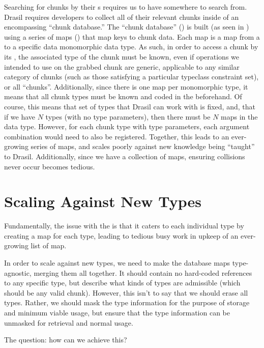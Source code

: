 
Searching for chunks by their \UID{}s requires us to have somewhere to search
from. Drasil requires developers to collect all of their relevant chunks inside
of an encompassing ``chunk database.'' The ``chunk database'' (\ChunkDB{}) is
built (as seen in ) using a series of maps
() that map \UID{} keys to chunk data. Each
map is a map from a \UID{} to a specific data monomorphic data type. As such, in
order to access a chunk by its \UID{}, the associated type of the chunk must be
known, even if operations we intended to use on the grabbed chunk are generic,
applicable to any similar category of chunks (such as those satisfying a
particular typeclass constraint set), or all ``chunks''. Additionally, since
there is one map per monomorphic type, it means that all chunk types must be
known and coded in the \ChunkDB{} beforehand. Of course, this means that set of
types that Drasil can work with is fixed, and, that if we have \(N\) types (with
no type parameters), then there must be \(N\) maps in the \ChunkDB{} data type.
However, for each chunk type with type parameters, each argument combination
would need to also be registered. Together, this leads to an ever-growing series
of maps, and scales poorly against new knowledge being ``taught'' to Drasil.
Additionally, since we have a collection of maps, ensuring \UID{} collisions
never occur becomes tedious.

\section{Scaling Against New Types}

Fundamentally, the issue with the \ChunkDB{} is that it caters to each
individual type by creating a map for each type, leading to tedious busy work in
upkeep of an ever-growing list of map.

In order to scale against new types, we need to make the database maps
type-agnostic, merging them all together. It should contain no hard-coded
references to any specific type, but describe what kinds of types are admissible
(which should be any valid chunk). However, this isn't to say that we should
erase all types. Rather, we should mask the type information for the purpose of
storage and minimum viable usage, but ensure that the type information can be
unmasked for retrieval and normal usage.

The question: how can we achieve this?

